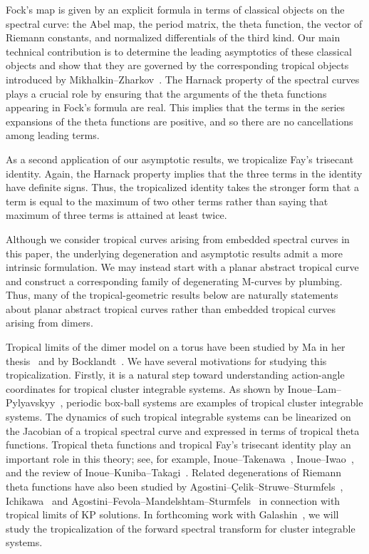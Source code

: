 \documentclass[12pt]{amsart}
\numberwithin{equation}{section}
\theoremstyle{definition}
\begin{document}
Fock's map is given by an explicit formula in terms of classical
objects on the spectral curve: the Abel map, the period matrix, the
theta function, the vector of Riemann constants, and normalized
differentials of the third kind. Our main technical contribution is to determine the leading asymptotics of these classical objects and show that they are governed by the corresponding tropical objects introduced by Mikhalkin--Zharkov~\cite{MZ}. The Harnack property of the spectral curves plays a crucial role by ensuring that the arguments of the theta functions appearing in Fock's formula are real. This implies that the terms in the series expansions of the theta functions are positive, and so there are no cancellations among leading terms.

As a second application of our asymptotic results, we tropicalize Fay's trisecant identity. Again, the Harnack property implies that the three terms in the identity have definite signs. Thus, the tropicalized identity takes the stronger form that a term is equal to the maximum of two other terms rather than saying that maximum of three terms is attained at least twice.

Although we consider tropical curves arising from embedded spectral curves in this paper, the underlying degeneration and asymptotic results admit a more intrinsic formulation. We may instead start with a planar abstract tropical curve and construct a corresponding family of degenerating M-curves by plumbing. Thus, many of the tropical-geometric results below are naturally statements about planar abstract tropical curves rather than embedded tropical curves arising from dimers. 


Tropical limits of the dimer model on a torus have been studied by Ma in her thesis~\cite{Ma2015} and by Bocklandt~\cite{bocklandt2015dimerabc,BocklandtStrebel}. We have several motivations for studying this tropicalization. Firstly, it is a natural step toward understanding action-angle coordinates for tropical cluster
integrable systems. As shown by
Inoue--Lam--Pylyavskyy~\cite{InoueLamPylyavskyy}, periodic box-ball
systems are examples of tropical cluster integrable systems. The dynamics of such tropical integrable systems can be
linearized on the Jacobian of a tropical spectral curve and expressed
in terms of tropical theta functions. Tropical theta functions and tropical Fay's
trisecant identity play an
important role in this theory; see, for example,
Inoue--Takenawa~\cite{InoueTakenawaSpectral,InoueTakenawaFay,InoueTakenawaJacobian},
Inoue--Iwao~\cite{InoueIwao}, and the review of
Inoue--Kuniba--Takagi~\cite{InoueKunibaTakagi}. Related degenerations of Riemann theta functions have also been studied by Agostini--Çelik--Struwe--Sturmfels~\cite{thetasurfaces}, Ichikawa~\cite{ichikwaCMP} and Agostini--Fevola--Mandelshtam--Sturmfels~\cite{AFMS} in connection with tropical limits of KP solutions. In forthcoming work with Galashin~\cite{GalashinGeorge2}, we will study
the tropicalization of the forward spectral transform for cluster integrable
systems.
\end{document}
